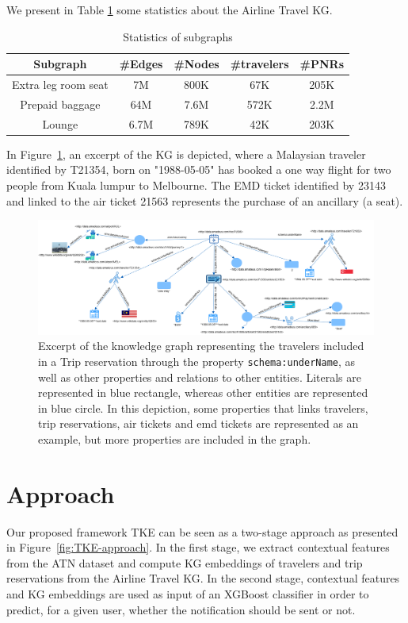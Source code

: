 \documentclass[11pt,dvipdfm]{article}
\begin{document}
We present in Table \ref{tab:subgraphs} some statistics about the Airline Travel KG. 
\begin{table}[htbp]
  \centering
  \caption{Statistics of subgraphs}
  \label{tab:subgraphs}
  \footnotesize
  \begin{tabular}{|c|c|c|c|c|}
    \hline
    Subgraph & \#Edges & \#Nodes & \#travelers & \#PNRs\\
    \hline
    Extra leg room seat & 7M & 800K & 67K & 205K \\
    \hline
    Prepaid baggage & 64M & 7.6M & 572K & 2.2M \\
    \hline
    Lounge & 6.7M & 789K & 42K & 203K \\
  \hline
\end{tabular}
\end{table}
In Figure~\ref{fig:kg}, an excerpt of the KG is depicted, where a Malaysian traveler identified by T21354, born on "1988-05-05" has booked a one way flight for two people from Kuala lumpur to Melbourne. The EMD ticket identified by 23143 and linked to the air ticket 21563 represents the purchase of an ancillary (a seat).
\begin{figure}[hbt!]
  \centering
  \includegraphics[width=\linewidth, height=6.5 cm]{submissions/email_marketing/figs/Airline_Travel_KG.png}
  \caption{Excerpt of the knowledge graph representing the travelers included in a Trip reservation through the property \texttt{schema:underName}, as well as other properties and relations to other entities. Literals are represented in blue rectangle, whereas other entities are represented in blue circle. In this depiction, some properties that links travelers, trip reservations, air tickets and emd tickets are represented as an example, but more properties are included in the graph.}
  \label{fig:kg}
\end{figure}

\section{Approach}
\label{sec:approach}
Our proposed framework TKE can be seen as a two-stage approach as presented in Figure~\ref{fig:TKE-approach}. In the first stage, we extract contextual features from the ATN dataset and compute KG embeddings of travelers and trip reservations from the Airline Travel KG. In the second stage, contextual features and KG embeddings are used as input of an XGBoost classifier in order to predict, for a given user, whether the notification should be sent or not.
\end{document}
